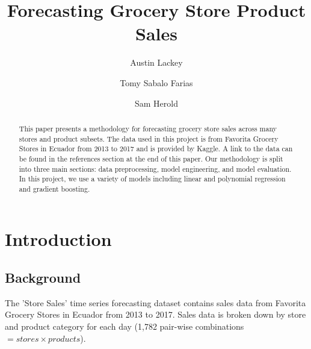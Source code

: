 \documentclass[12pt]{article}
\title{Forecasting Grocery Store Product Sales}
\author{Austin Lackey}
\author{Tomy Sabalo Farias}
\author{Sam Herold}
\affil{DSCI 478, Colorado State University}
\begin{document}
\maketitle

\begin{abstract}
This paper presents a methodology for forecasting grocery store sales across many stores and product subsets.
The data used in this project is from Favorita Grocery Stores in Ecuador from 2013 to 2017 and is provided by Kaggle.
A link to the data can be found in the references section at the end of this paper.
Our methodology is split into three main sections: data preprocessing, model engineering, and model evaluation.
In this project, we use a variety of models including linear and polynomial regression and gradient boosting.
\end{abstract}

\section{Introduction}
\subsection{Background}
The 'Store Sales' time series forecasting dataset contains sales data from Favorita Grocery Stores in Ecuador from 2013 to 2017\cite{kaggle}.
Sales data is broken down by store and product category for each day (1,782 pair-wise combinations $=stores \times products$).
\end{document}
